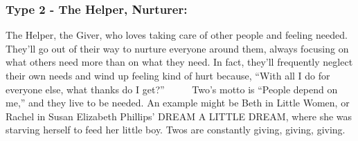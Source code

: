 \documentclass[openleft,oneside,showtrims]{memoir}
\begin{document}
\subsubsection*{Type 2 - The Helper, Nurturer:}
\label{sec:org23ad84f}

The Helper, the Giver, who loves taking care of other people and feeling needed. They'll go out of their way to nurture everyone around them, always focusing on what others need more than on what they need. In fact, they'll frequently neglect their own needs and wind up feeling kind of hurt because, ``With all I do for everyone else, what thanks do I get?''       Two's motto is ``People depend on me,'' and they live to be needed. An example might be Beth in Little Women, or Rachel in Susan Elizabeth Phillips' DREAM A LITTLE DREAM, where she was starving herself to feed her little boy. Twos are constantly giving, giving, giving.
\end{document}
